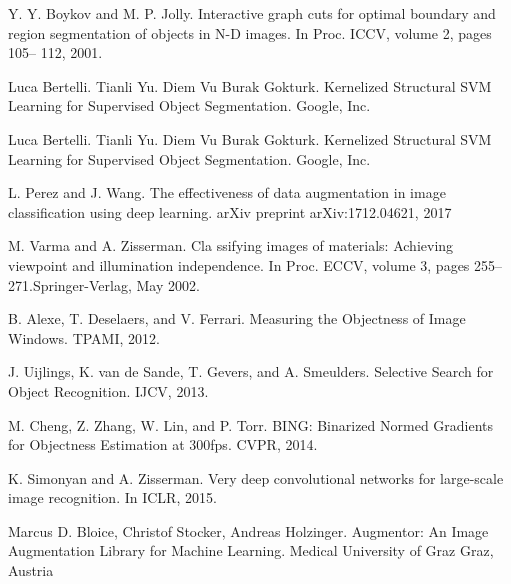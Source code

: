 \documentclass[12pt]{report}
\begin{document}
\begin{thebibliography}{9}
			Y. Y. Boykov and M. P. Jolly. Interactive graph cuts for optimal boundary and region segmentation of objects in N-D images. In Proc. ICCV, volume 2, pages 105– 112, 2001.
																																																																																									
			Luca Bertelli. Tianli Yu. Diem Vu Burak Gokturk. Kernelized Structural SVM Learning for Supervised Object Segmentation. Google, Inc.
																																																																																							
			Luca Bertelli. Tianli Yu. Diem Vu Burak Gokturk. Kernelized Structural SVM Learning for Supervised Object Segmentation. Google, Inc.
																																																																																							
			L. Perez and J. Wang. The effectiveness of data augmentation in image classification using deep learning. arXiv preprint arXiv:1712.04621, 2017
																																																																																				
			M. Varma and A. Zisserman. Cla	ssifying images of materials: Achieving viewpoint and illumination independence. In Proc. ECCV, volume 3, pages 255–271.Springer-Verlag, May 2002.	
																																																																																							
			B. Alexe, T. Deselaers, and V. Ferrari. Measuring the Objectness of Image Windows. TPAMI, 2012.
																																																																																				
			J. Uijlings, K. van de Sande, T. Gevers, and A. Smeulders. Selective Search for Object Recognition. IJCV, 2013.
																																																																																				
			M. Cheng, Z. Zhang, W. Lin, and P. Torr. BING: Binarized Normed Gradients for Objectness Estimation at 300fps. CVPR, 2014.
																																																																																				
			K. Simonyan and A. Zisserman. Very deep convolutional networks for large-scale image recognition. In ICLR, 2015.
																																																																																				
			Marcus D. Bloice, Christof Stocker, Andreas Holzinger. Augmentor: An Image Augmentation Library for Machine Learning. Medical University of Graz Graz, Austria
																																																																																				
																																																																																				
		\end{thebibliography}
																																																																						
\end{document}
